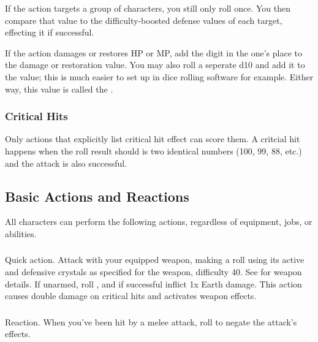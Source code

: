 \begin{multicols}{2}
        If the action targets a group of characters, you still only roll once. You then compare that value to the difficulty-boosted defense values of each target, effecting it if successful.

        If the action damages or restores HP or MP, add the digit in the one's place to the damage or restoration value. You may also roll a seperate d10 and add it to the value; this is much easier to set up in dice rolling software for example. Either way, this value is called the .


        \subsubsection{Critical Hits}
            Only actions that explicitly list critical hit effect can score them. A critcial hit happens when the roll result should is two identical numbers (100, 99, 88, etc.) and the attack is also successful.

    \subsection{Basic Actions and Reactions}\label{subsec:basicactions}
        All characters can perform the following actions, regardless of equipment, jobs, or abilities. 

        \subsubsection{}
            Quick action. Attack with your equipped weapon, making a roll using its active and defensive crystals as specified for the weapon, difficulty 40. See  for weapon details. If unarmed, roll , and if successful inflict 1x Earth damage. This action causes double damage on critical hits and activates weapon effects.

        \subsubsection{}
            Reaction. When you've been hit by a melee attack, roll  to negate the attack's effects.


\end{multicols}
